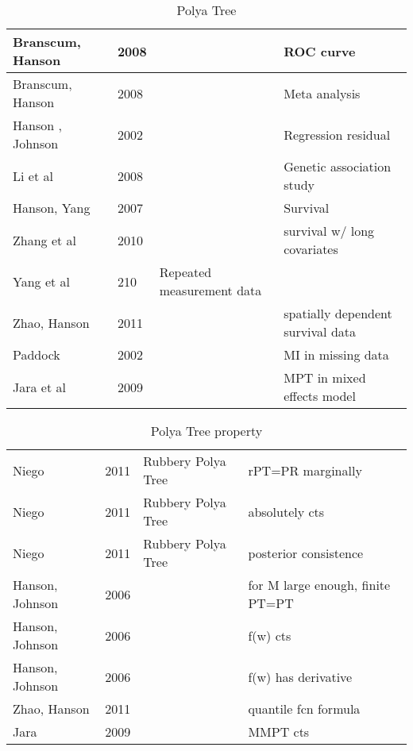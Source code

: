 \documentclass{article}
\begin{document}
\begin{table}[htbp]
\caption[]{ Polya Tree}
\vspace{4mm}
\begin{tabular}[tb]{m{4cm}|m{1cm}|m{5cm}|m{5cm}}
\hline
Branscum, Hanson & 2008 && ROC curve\\
\hline
Branscum, Hanson & 2008 && Meta analysis\\
\hline
Hanson , Johnson & 2002 && Regression residual \\
\hline 
Li et al & 2008 && Genetic association study \\
\hline
Hanson, Yang & 2007 && Survival \\
\hline
Zhang et al & 2010 & & survival w/ long covariates\\
\hline 
Yang et al & 210 & Repeated measurement data\\
\hline
Zhao, Hanson & 2011 && spatially dependent survival data\\
\hline
Paddock & 2002 & & MI in missing data\\
\hline
Jara et al & 2009 && MPT in mixed effects model \\
\hline
\end{tabular}

\end{table}

\begin{table}[htbp]
\caption[]{ Polya Tree property}
\vspace{4mm}

\begin{tabular}[tb]{m{4cm}|m{1cm}|m{5cm}|m{5cm}}
\hline
Niego           & 2011 & Rubbery Polya Tree & rPT=PR marginally                \\
Niego           & 2011 & Rubbery Polya Tree & absolutely cts                   \\
Niego           & 2011 & Rubbery Polya Tree & posterior consistence            \\
Hanson, Johnson & 2006 &                    & for M large enough, finite PT=PT \\
Hanson, Johnson & 2006 &                    & f(w) cts                         \\
Hanson, Johnson & 2006 &                    & f(w) has derivative              \\
Zhao, Hanson    & 2011 &                    & quantile fcn formula             \\
Jara            & 2009 &                    & MMPT cts  \\
\hline
\end{tabular}
\end{table}
\end{document}
